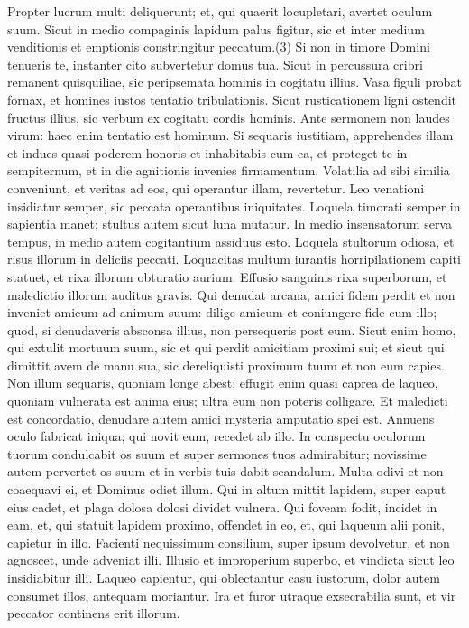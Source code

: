 \begin{biblechapter}  
\verse Propter lucrum multi deliquerunt; et, qui quaerit locupletari, avertet oculum suum. 
\verse Sicut in medio compaginis lapidum palus figitur, sic et inter medium venditionis et emptionis constringitur peccatum.(3) 
\verse Si non in timore Domini tenueris te, instanter cito subvertetur domus tua. 
\verse Sicut in percussura cribri remanent quisquiliae, sic peripsemata hominis in cogitatu illius. 
\verse Vasa figuli probat fornax, et homines iustos tentatio tribulationis. 
\verse Sicut rusticationem ligni ostendit fructus illius, sic verbum ex cogitatu cordis hominis. 
\verse Ante sermonem non laudes virum: haec enim tentatio est hominum. 
\verse Si sequaris iustitiam, apprehendes illam et indues quasi poderem honoris et inhabitabis cum ea, et proteget te in sempiternum, et in die agnitionis invenies firmamentum. 
\verse Volatilia ad sibi similia conveniunt, et veritas ad eos, qui operantur illam, revertetur. 
\verse Leo venationi insidiatur semper, sic peccata operantibus iniquitates. 
\verse Loquela timorati semper in sapientia manet; stultus autem sicut luna mutatur. 
\verse In medio insensatorum serva tempus, in medio autem cogitantium assiduus esto. 
\verse Loquela stultorum odiosa, et risus illorum in deliciis peccati. 
\verse Loquacitas multum iurantis horripilationem capiti statuet, et rixa illorum obturatio aurium. 
\verse Effusio sanguinis rixa superborum, et maledictio illorum auditus gravis. 
\verse Qui denudat arcana, amici fidem perdit et non inveniet amicum ad animum suum: 
\verse dilige amicum et coniungere fide cum illo; 
\verse quod, si denudaveris absconsa illius, non persequeris post eum. 
\verse Sicut enim homo, qui extulit mortuum suum, sic et qui perdit amicitiam proximi sui; 
\verse et sicut qui dimittit avem de manu sua, sic dereliquisti proximum tuum et non eum capies. 
\verse Non illum sequaris, quoniam longe abest; effugit enim quasi caprea de laqueo, quoniam vulnerata est anima eius; 
\verse ultra eum non poteris colligare. Et maledicti est concordatio, 
\verse denudare autem amici mysteria amputatio spei est. 
\verse Annuens oculo fabricat iniqua; qui novit eum, recedet ab illo. 
\verse In conspectu oculorum tuorum condulcabit os suum et super sermones tuos admirabitur; novissime autem pervertet os suum et in verbis tuis dabit scandalum. 
\verse Multa odivi et non coaequavi ei, et Dominus odiet illum. 
\verse Qui in altum mittit lapidem, super caput eius cadet, et plaga dolosa dolosi dividet vulnera. 
\verse Qui foveam fodit, incidet in eam, et, qui statuit lapidem proximo, offendet in eo, et, qui laqueum alii ponit, capietur in illo. 
\verse Facienti nequissimum consilium, super ipsum devolvetur, et non agnoscet, unde adveniat illi. 
\verse Illusio et improperium superbo, et vindicta sicut leo insidiabitur illi. 
\verse Laqueo capientur, qui oblectantur casu iustorum, dolor autem consumet illos, antequam moriantur. 
\verse Ira et furor utraque exsecrabilia sunt, et vir peccator continens erit illorum. 
\end{biblechapter}

